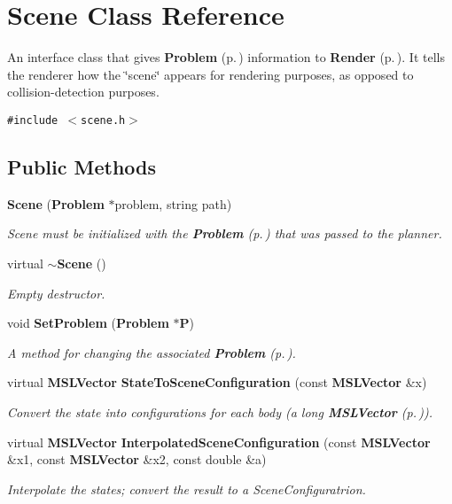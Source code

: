 \section{Scene  Class Reference}
\label{classScene}
An interface class that gives {\bf Problem} {\rm (p.\,\pageref{classProblem})} information to {\bf Render} {\rm (p.\,\pageref{classRender})}. It tells the renderer how the \char`\"{}scene\char`\"{} appears for rendering purposes, as opposed to collision-detection purposes. 


{\tt \#include $<$scene.h$>$}

\subsection*{Public Methods}
\begin{CompactItemize}
\item 
{\bf Scene} ({\bf Problem} $\ast$problem, string path)
\begin{CompactList}\small\item\em Scene must be initialized with the {\bf Problem} {\rm (p.\,\pageref{classProblem})} that was passed to the planner.\item\end{CompactList}\item 
virtual {\bf $\sim$Scene} ()
\begin{CompactList}\small\item\em Empty destructor.\item\end{CompactList}\item 
void {\bf Set\-Problem} ({\bf Problem} $\ast${\bf P})
\begin{CompactList}\small\item\em A method for changing the associated {\bf Problem} {\rm (p.\,\pageref{classProblem})}.\item\end{CompactList}\item 
virtual {\bf MSLVector} {\bf State\-To\-Scene\-Configuration} (const {\bf MSLVector} \&x)
\begin{CompactList}\small\item\em Convert the state into configurations for each body (a long {\bf MSLVector} {\rm (p.\,\pageref{classMSLVector})}).\item\end{CompactList}\item 
virtual {\bf MSLVector} {\bf Interpolated\-Scene\-Configuration} (const {\bf MSLVector} \&x1, const {\bf MSLVector} \&x2, const double \&a)
\begin{CompactList}\small\item\em Interpolate the states; convert the result to a Scene\-Configuratrion.\item\end{CompactList}\end{CompactItemize}
